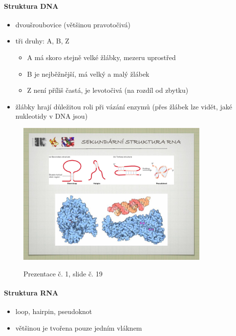 \documentclass[DIV=8]{scrreprt}
\begin{document}
\paragraph{Struktura DNA}
\begin{itemize}[nosep]
    \item dvoušroubovice (většinou pravotočivá)
    \item tři druhy: A, B, Z
\begin{itemize}[nosep]
    \item A má skoro stejně velké žlábky, mezeru uprostřed
    \item B je nejběžnější, má velký a malý žlábek
    \item Z není příliš častá, je levotočivá (na rozdíl od zbytku)
\end{itemize}

    \item žlábky hrají důležitou roli při vázání enzymů (přes žlábek lze vidět, jaké nukleotidy v DNA jsou)
\end{itemize}



\begin{figure}
    \caption{Prezentace č. 1, slide č. 19}
    \includegraphics[width=0.85\textwidth]{slides-1/slide-19.jpg}
    \centering
    \label{slides-1-slide-19}
\end{figure}

\paragraph{Struktura RNA}
\begin{itemize}[nosep]
    \item loop, hairpin, pseudoknot
    \item většinou je tvořena pouze jedním vláknem
\end{itemize}
\end{document}
